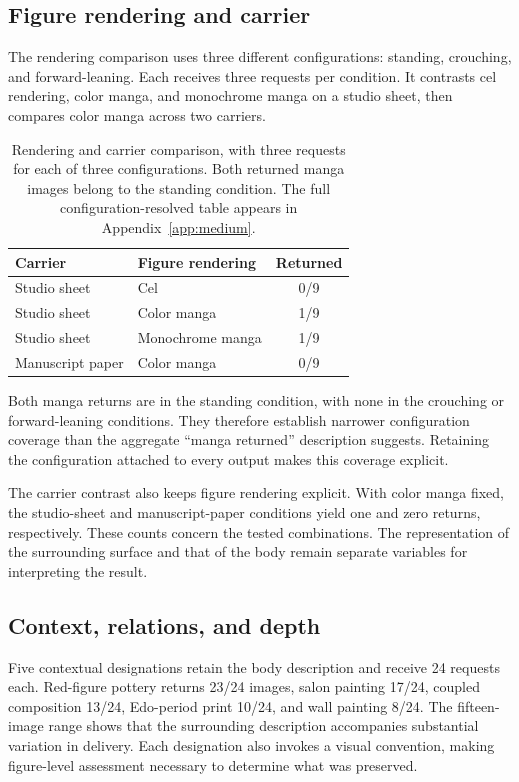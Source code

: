 \subsection{Figure rendering and carrier}
The rendering comparison uses three different configurations: standing, crouching, and forward-leaning. Each receives three requests per condition. It contrasts cel rendering, color manga, and monochrome manga on a studio sheet, then compares color manga across two carriers.

\begin{table}[t]
\centering\small
\begin{tabularx}{\linewidth}{@{}YYc@{}}
\toprule
Carrier & Figure rendering & Returned \\
\midrule
Studio sheet & Cel & 0/9 \\
Studio sheet & Color manga & 1/9 \\
Studio sheet & Monochrome manga & 1/9 \\
Manuscript paper & Color manga & 0/9 \\
\bottomrule
\end{tabularx}
\caption{Rendering and carrier comparison, with three requests for each of three configurations. Both returned manga images belong to the standing condition. The full configuration-resolved table appears in Appendix~\ref{app:medium}.}
\label{tab:rendering}
\end{table}

Both manga returns are in the standing condition, with none in the crouching or forward-leaning conditions. They therefore establish narrower configuration coverage than the aggregate ``manga returned'' description suggests. Retaining the configuration attached to every output makes this coverage explicit.

The carrier contrast also keeps figure rendering explicit. With color manga fixed, the studio-sheet and manuscript-paper conditions yield one and zero returns, respectively. These counts concern the tested combinations. The representation of the surrounding surface and that of the body remain separate variables for interpreting the result.

\subsection{Context, relations, and depth}
Five contextual designations retain the body description and receive 24 requests each. Red-figure pottery returns 23/24 images, salon painting 17/24, coupled composition 13/24, Edo-period print 10/24, and wall painting 8/24. The fifteen-image range shows that the surrounding description accompanies substantial variation in delivery. Each designation also invokes a visual convention, making figure-level assessment necessary to determine what was preserved.

